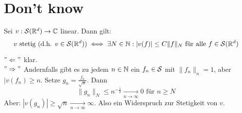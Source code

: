 \section{Don't know} %


\setcounter{satz}{2}

\begin{satz} \label{satz:4.3}
	Sei $v : \mathcal{S}(\mathbb{R}^{d}) \rightarrow \mathbb{C}$ linear. Dann gilt:
	\[ v \text{ stetig (d.h. } v \in \mathcal{S}(\mathbb{R}^{d}) \text{)} \iff \exists N \in \mathbb{N}: |v(f)| \leq C \| f \|_{N} \text{ für alle } f \in \mathcal{S}(\mathbb{R}^{d}) \]
\end{satz}

\begin{beweis}
	$"\Leftarrow"$ klar. \\
	$"\Rightarrow"$ Andernfalls gibt es zu jedem $n \in \mathbb{N}$ ein $f_{n} \in \mathcal{S}$ mit $\|f_{n}\|_{n} = 1$, aber $|v(f_{n}) \geq n$. Setze $g_{n} = \frac{f_{n}}{\sqrt{n}}$. Dann
		\[ \| g_{n} \|_{N} \leq n^{-\frac{1}{2}} \xrightarrow[n \rightarrow \infty]{} 0 \text{ für } n \geq N \]
		Aber: $|v(g_{n})| \geq \sqrt{n} \xrightarrow[n \rightarrow \infty]{} \infty$. Also ein Widerspruch zur Stetigkeit von $v$.
\end{beweis}


